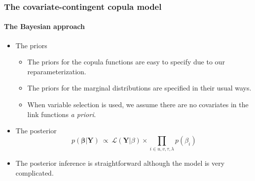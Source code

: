 \documentclass{beamer}
\begin{document}





\begin{frame}
  \frametitle{The covariate-contingent copula model}
  \framesubtitle{The Bayesian approach}
  \begin{itemize}

  \item The priors

    \begin{itemize}

    \item The priors for the copula functions are easy to specify due to our
      reparameterization.

    \item  The priors for the marginal distributions are specified in their usual
      ways.

    \item When variable selection is used, we assume there are no covariates in
      the link functions \emph{a priori}.

    \end{itemize}

  \item The posterior
    \begin{equation*}
      p(\bm{\beta}|\bm{Y})~ \propto~ \mathcal{L} (\mathbf{Y}| \beta) \times
      \prod \limits_{i \in u,v,\tau,\lambda} p(\beta_i)
    \end{equation*}

  \item The posterior inference is straightforward although the model is very complicated.
  \end{itemize}
\end{frame}
\end{document}
